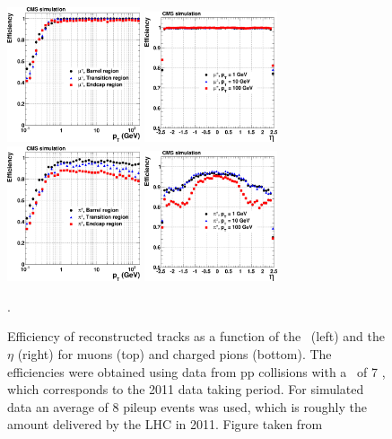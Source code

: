 \begin{figure}[ht]
  \begin{center}
    \includegraphics[width=0.35\textwidth]{figuras/Chapter3/TrackEff_Muon_pt.png}
    \includegraphics[width=0.35\textwidth]{figuras/Chapter3/TrackEff_Muon_eta.png}
    \includegraphics[width=0.35\textwidth]{figuras/Chapter3/TrackEff_Pion_pt.png}
    \includegraphics[width=0.35\textwidth]{figuras/Chapter3/TrackEff_Pion_eta.png}
    \caption{Efficiency of reconstructed tracks as a function of the \pt~(left) and the $\eta$ (right) for 
    muons (top) and charged pions (bottom). The efficiencies were obtained using data from pp collisions 
    with a \centermassenergy~of 7 \TeV, which corresponds to the 2011 data taking period. For simulated data 
    an average of 8 pileup events was used, which is roughly the amount delivered by the LHC in 2011. Figure taken from \cite{TrackAndVertexReconstruction}}.
    \label{fig:Track_Efficiencies}
  \end{center}
\end{figure}

